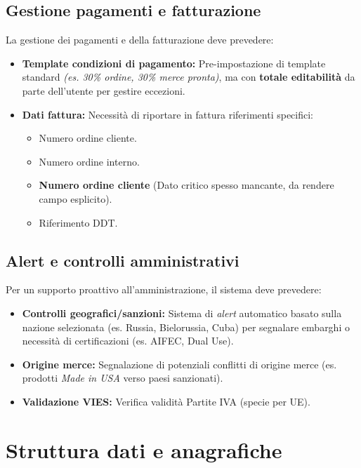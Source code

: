 \documentclass[12pt, a4paper]{article} %
\begin{document}
\subsection{Gestione pagamenti e fatturazione}
La gestione dei pagamenti e della fatturazione deve prevedere:
\begin{itemize}
      \item \textbf{Template condizioni di pagamento:} Pre-impostazione di template standard \textit{(es. 30\% ordine, 30\% merce pronta)}, ma con \textbf{totale editabilità} da parte dell'utente per gestire eccezioni.
      \item \textbf{Dati fattura:} Necessità di riportare in fattura riferimenti specifici:
            \begin{itemize}
                  \item Numero ordine cliente.
                  \item Numero ordine interno.
                  \item \textbf{Numero ordine cliente} (Dato critico spesso mancante, da rendere campo esplicito).
                  \item Riferimento DDT.
            \end{itemize}
\end{itemize}

\subsection{Alert e controlli amministrativi}
Per un supporto proattivo all'amministrazione, il sistema deve prevedere:
\begin{itemize}
      \item \textbf{Controlli geografici/sanzioni:} Sistema di \textit{alert} automatico basato sulla nazione selezionata (es. Russia, Bielorussia, Cuba)
            per segnalare embarghi o necessità di certificazioni (es. AIFEC, Dual Use).
      \item \textbf{Origine merce:} Segnalazione di potenziali conflitti di origine merce (es. prodotti \textit{Made in USA} verso paesi sanzionati).
      \item \textbf{Validazione VIES:} Verifica validità Partite IVA (specie per UE).
\end{itemize}

\section{Struttura dati e anagrafiche}
\end{document}
